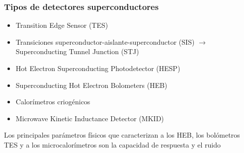 \documentclass{beamer}
\begin{document}
\begin{frame}
				\frametitle{Tipos de detectores superconductores}
\begin{itemize}
				\item \alert{T}ransition \alert{E}dge
								\alert{S}ensor (TES)
				\item Transiciones
								superconductor-aislante-superconductor
								(SIS) $\to$ \alert{S}uperconducting
								\alert{T}unnel \alert{J}unction
								(STJ)
				\item \alert{H}ot
								\alert{E}lectron
								\alert{S}uperconducting
								\alert{P}hotodetector (HESP)
				\item \alert{S}uperconducting
								\alert{H}ot
								\alert{E}lectron
								\alert{B}olometers (HEB)
				\item Calorímetros
								criogénicos
				\item \alert{M}icrowave \alert{K}inetic \alert{I}nductance \alert{D}etector (MKID)

\end{itemize}
				\begin{block}{}
								\alert{Los principales parámetros físicos que caracterizan a los HEB, los 
								bolómetros TES y a los microcalorímetros son la capacidad de
								respuesta y el ruido}
				\end{block}
\end{frame}
\end{document}
